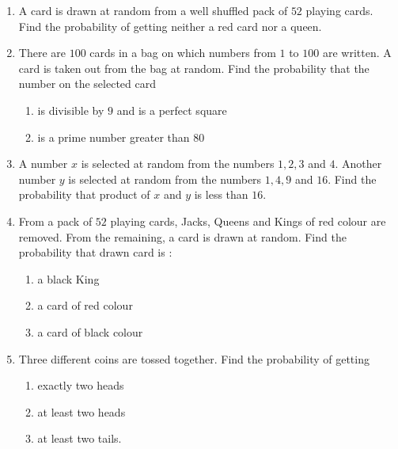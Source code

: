 \begin{enumerate}
\item A card is drawn at random from a well shuffled pack of $52$ playing cards. Find the probability of getting neither a red card nor a queen.\\
\item There are $100$ cards in a bag on which numbers from $1$ to $100$ are written. A card is taken out from the bag at random. Find the probability that the number on the selected card 
\begin{enumerate}[label=(\roman*)]
\item is divisible by $9$ and is a perfect square 
\item is a prime number greater than $80$
\end{enumerate}
\item A number $x$ is selected at random from the numbers $1, 2, 3$ and $4$. Another number $y$ is selected at random from the numbers $1, 4, 9$ and $16$. Find the probability that product of $x$ and $y$ is less than $16$.\\
\item From a pack of $52$ playing cards, Jacks, Queens and Kings of red colour are removed. From the remaining, a card is drawn at random. Find the probability that drawn card is :
\begin{enumerate}[label=(\roman*)]
\item a black King 
\item a card of red colour 
\item a card of black colour
\end{enumerate}
\item  Three different coins are tossed together. Find the probability of getting 
\begin{enumerate}[label=(\roman*)]
\item exactly two heads 
\item at least two heads 
\item at least two tails.
\end{enumerate}
\end{enumerate}
